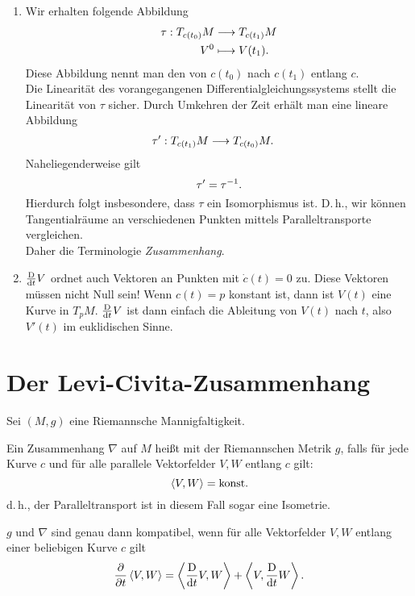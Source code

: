 \Bem{}
\begin{enumerate}[1.)]
	\item Wir erhalten folgende Abbildung
	\begin{align*}
	\tau : T_{c(t_0)}M & \overset{}{\longrightarrow} T_{c(t_1)}M\\
	V^0 & \longmapsto V(t_1).
	\end{align*}
	Diese Abbildung nennt man den  von $c(t_0)$ nach $c(t_1)$ entlang $c$.\\
	Die Linearität des vorangegangenen Differentialgleichungssystems stellt die Linearität von $\tau$ sicher. Durch Umkehren der Zeit erhält man eine lineare Abbildung
	\begin{align*}
	\tau' : T_{c(t_1)}M & \overset{}{\longrightarrow} T_{c(t_0)}M.
	\end{align*}
	Naheliegenderweise gilt
	\[ \tau' = \tau^{-1} .\]
	Hierdurch folgt insbesondere, dass $\tau$ ein Isomorphismus ist. D.\,h., wir können Tangentialräume an verschiedenen Punkten mittels Paralleltransporte vergleichen.\\
	Daher die Terminologie \textsl{Zusammenhang}.
	\item $\frac{\text{D}}{\text{d} t}V$ ordnet auch Vektoren an Punkten mit $\dot{c}(t) = 0$ zu. Diese Vektoren müssen nicht Null sein!
	\Bsp{}
	Wenn $c(t) = p$ konstant ist, dann ist $V(t)$ eine Kurve in $T_pM$. $\frac{\text{D}}{\text{d} t}V$ ist dann einfach die Ableitung von $V(t)$ nach $t$, also $V'(t)$ im euklidischen Sinne.
\end{enumerate}


\newpage
\section{Der Levi-Civita-Zusammenhang}
Sei $(M, g)$ eine Riemannsche Mannigfaltigkeit.

\Def{}
Ein Zusammenhang $\nabla$ auf $M$ heißt  mit der Riemannschen Metrik $g$, falls für jede Kurve $c$ und für alle parallele Vektorfelder $V,W$ entlang $c$ gilt:
\[ \left<V,W\right> = \text{konst.} \]
d.\,h., der Paralleltransport ist in diesem Fall sogar eine Isometrie.

\Prop{}
$g$ und $\nabla$ sind genau dann kompatibel, wenn für alle Vektorfelder $V,W$ entlang einer beliebigen Kurve $c$ gilt
\[ \frac{\partial }{\partial t}\left<V,W\right> = \left< \frac{\text{D}}{\text{d} t}V, W \right> +\left<V, \frac{\text{D}}{\text{d} t} W\right>. \]

